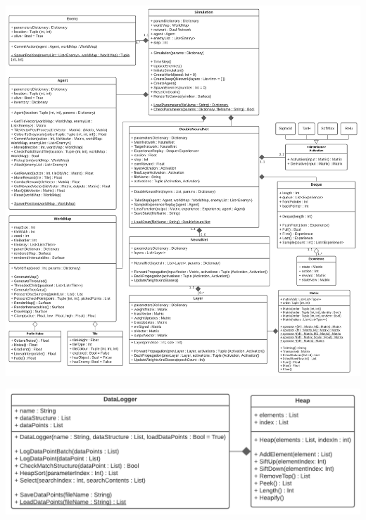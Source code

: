 \begin{flushleft}
            \vspace{0.5cm}
            \centerline{\includegraphics[width=\textwidth]{Images/Design/ClassDiagram.png}}
            \vspace{0.5cm}
            \centerline{\includegraphics[width=.65\textwidth]{Images/Design/DataLoggerDiagram.png}}
            \vspace{0.5cm}
            \pagebreak


\end{flushleft}
